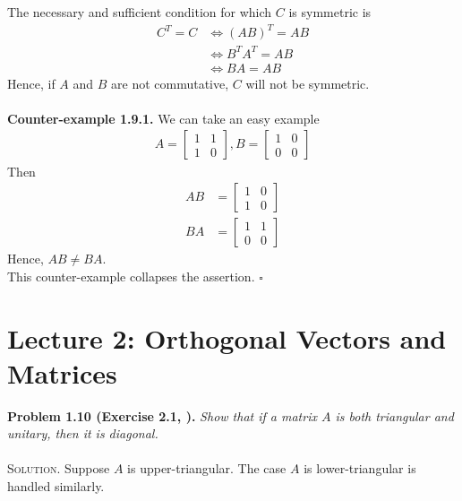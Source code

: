 \documentclass[a4paper,oneside]{book}
\numberwithin{equation}{chapter}
\begin{document}
The necessary and sufficient condition for which $C$ is symmetric is
\begin{align}
{C^T} = C &\Leftrightarrow {\left( {AB} \right)^T} = AB\\
 &\Leftrightarrow {B^T}{A^T} = AB\\
 &\Leftrightarrow BA = AB
\end{align}
Hence, if $A$ and $B$ are not commutative, $C$ will not be symmetric.\\
\\
\textbf{Counter-example 1.9.1.} We can take an easy example
\begin{align}
A = \left[ {\begin{array}{*{20}{c}}
1&1\\
1&0
\end{array}} \right],B = \left[ {\begin{array}{*{20}{c}}
1&0\\
0&0
\end{array}} \right]
\end{align}
Then 
\begin{align}
AB &= \left[ {\begin{array}{*{20}{c}}
1&0\\
1&0
\end{array}} \right]\\
BA &= \left[ {\begin{array}{*{20}{c}}
1&1\\
0&0
\end{array}} \right]
\end{align}
Hence, $AB \ne BA$.\\
This counter-example collapses the assertion. \hfill $\square$\\
\section{Lecture 2: Orthogonal Vectors and Matrices}
\textbf{Problem 1.10 (Exercise 2.1, \cite{1}).} \textit{Show that if a matrix $A$ is both triangular and unitary, then it is diagonal.}\\
\\
\textsc{Solution.} Suppose $A$ is upper-triangular. The case $A$ is lower-triangular is handled similarly.
\end{document}
